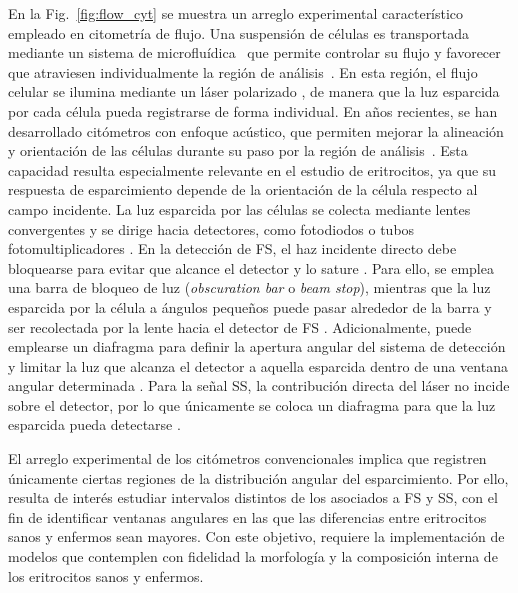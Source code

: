 En la Fig.~\ref{fig:flow_cyt} se muestra un arreglo experimental característico empleado en citometría de flujo. Una suspensión de células es transportada mediante un sistema de microfluídica~\cite{shriraoMicrofluidicFlow2018} que permite controlar su flujo y favorecer que atraviesen individualmente la región de análisis~\cite{mckinnonFlowCytometryOverview2018}. En esta región, el flujo celular se ilumina mediante un láser polarizado \cite{asburyPolarizationScatterFluorescence2000}, de manera que la luz esparcida por cada célula pueda registrarse de forma individual. En años recientes, se han desarrollado citómetros con enfoque acústico, que permiten mejorar la alineación y orientación de las células durante su paso por la región de análisis~\cite{giengerAssessmentDeformationHuman2019}. Esta capacidad resulta especialmente relevante en el estudio de eritrocitos, ya que su respuesta de esparcimiento depende de la orientación de la célula respecto al campo incidente. La luz esparcida por las células se colecta mediante lentes convergentes y se dirige hacia detectores, como fotodiodos o tubos fotomultiplicadores \cite{mckinnonFlowCytometryOverview2018}. En la detección de FS, el haz incidente directo debe bloquearse para evitar que alcance el detector y lo sature \cite{arkesteijnImprovedFlowCytometric2020}. Para ello, se emplea una barra de bloqueo de luz (\textit{obscuration bar} o \textit{beam stop}), mientras que la luz esparcida por la célula a ángulos pequeños puede pasar alrededor de la barra y ser recolectada por la lente hacia el detector de FS \cite{arkesteijnImprovedFlowCytometric2020}. Adicionalmente, puede emplearse un diafragma para definir la apertura angular del sistema de detección y limitar la luz que alcanza el detector a aquella esparcida dentro de una ventana angular determinada \cite{arkesteijnImprovedFlowCytometric2020}. Para la señal SS, la contribución directa del láser no incide sobre el detector, por lo que únicamente se coloca un diafragma para que la luz esparcida pueda detectarse \cite{arkesteijnImprovedFlowCytometric2020}. 

El arreglo experimental de los citómetros convencionales implica que registren únicamente ciertas regiones de la distribución angular del esparcimiento. Por ello, resulta de interés estudiar intervalos distintos de los asociados a FS y SS, con el fin de identificar ventanas angulares en las que las diferencias entre eritrocitos sanos y enfermos sean mayores. Con este objetivo, requiere la implementación de modelos que contemplen con fidelidad la morfología y la composición interna de los eritrocitos sanos y enfermos.


